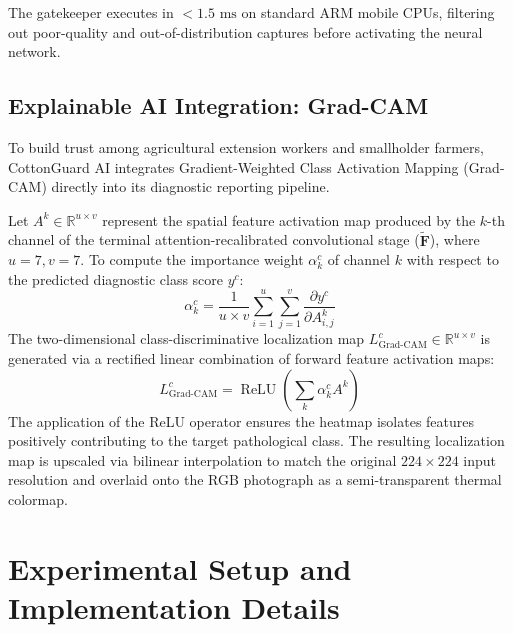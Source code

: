 \documentclass[journal,10pt,twocolumn]{IEEEtran}
\begin{document}
The gatekeeper executes in $<1.5\text{ ms}$ on standard ARM mobile CPUs, filtering out poor-quality and out-of-distribution captures before activating the neural network.

\subsection{Explainable AI Integration: Grad-CAM}
To build trust among agricultural extension workers and smallholder farmers, CottonGuard AI integrates Gradient-Weighted Class Activation Mapping (Grad-CAM) \cite{selvaraju2017grad} directly into its diagnostic reporting pipeline.

Let $A^k \in \mathbb{R}^{u \times v}$ represent the spatial feature activation map produced by the $k$-th channel of the terminal attention-recalibrated convolutional stage ($\widetilde{\mathbf{F}}$), where $u=7, v=7$. To compute the importance weight $\alpha_k^c$ of channel $k$ with respect to the predicted diagnostic class score $y^c$:
\begin{equation}
\alpha_k^c = \frac{1}{u \times v} \sum_{i=1}^u \sum_{j=1}^v \frac{\partial y^c}{\partial A_{i, j}^k}
\end{equation}
The two-dimensional class-discriminative localization map $L_{\text{Grad-CAM}}^c \in \mathbb{R}^{u \times v}$ is generated via a rectified linear combination of forward feature activation maps:
\begin{equation}
L_{\text{Grad-CAM}}^c = \operatorname{ReLU}\left( \sum_k \alpha_k^c A^k \right)
\end{equation}
The application of the ReLU operator ensures the heatmap isolates features positively contributing to the target pathological class. The resulting localization map is upscaled via bilinear interpolation to match the original $224 \times 224$ input resolution and overlaid onto the RGB photograph as a semi-transparent thermal colormap.

\section{Experimental Setup and Implementation Details}
\end{document}
